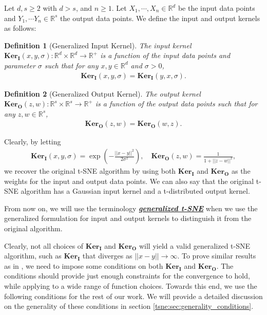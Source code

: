 \documentclass[10pt]{article}
\newtheorem{definition}{\bf Definition}
\newenvironment{Proof of lemma}{\noindent{\bf Proof of Lemma}}{\hfill$\Box$\newline}
\newenvironment{Proof of claim}{\noindent{\bf Proof of claim}}{\hfill$\Box$\newline}
\newenvironment{Proof of theorem}{\noindent{\bf Proof of Theorem}}{\hfill\scriptsize{$\Box$}\newline}
\newenvironment{Proof of theorems}{\noindent{\bf Proof of Theorems}}{\hfill$\Box$\newline}
\newenvironment{Proof of proposition}{\noindent{\bf Proof of Proposition}}{\hfill$\Box$\newline}
\newenvironment{Proof of propositions}{\noindent{\bf Proof of Propositions}}{\hfill$\Box$\newline}
\newenvironment{Proof of exercise}{\noindent{\it Proof of Exercise:}}{\hfill$\Box$}
\numberwithin{equation}{section}
\newcommand{\ki}{\mathbf{Ker}_{\mathbf{I}}}
\newcommand{\ko}{\mathbf{Ker}_{\mathbf{O}}}
\begin{document}
Let $d,s \geq 2$ with $d>s$, and $n \geq 1$. Let $X_1, \cdots, X_n \in
    \mathbb{R}^d$ be the input data points and $Y_1, \cdots Y_n \in \mathbb{R}^s$
the output data points. We define the input and output kernels as follows:
\begin{definition} [Generalized Input Kernel] \label{def:input_kernel}
    The input kernel $\ki(x,y,\sigma): \mathbb{R}^d  \times \mathbb{R}^d \to \mathbb{R}^+$ is a function of the input data points and parameter $\sigma$ such that for any $x,y \in \mathbb{R}^d$ and $\sigma > 0$,
    \begin{align}
        \ki(x,y,\sigma)=\ki(y,x,\sigma).
    \end{align}
\end{definition}
\begin{definition} [Generalized Output Kernel] \label{def:output_kernel}
    The output kernel $\ko(z,w):\mathbb{R}^s \times \mathbb{R}^s \to \mathbb{R}^+$ is a function of the output data points such that for any $z,w \in \mathbb{R}^s$,
    \begin{align}
        \ko(z,w)=\ko(w,z).
    \end{align}
\end{definition}
Clearly, by letting
\begin{align}
    \ki(x,y,\sigma)=\exp\left(-\frac{||x-y||^2}{2\sigma^2}\right), \quad \ko(z,w)=\frac{1}{1+||z-w||^2},
\end{align}
we recover the original t-SNE algorithm by using both $\ki$ and $\ko$ as the weights for the input and output data points. We can also say that the original t-SNE algorithm has a Gaussian input kernel and a t-distributed output kernel.

From now on, we will use the terminology \underline{\textbf{\textit{generalized
            t-SNE}}} when we use the generalized formulation for input and output kernels
to distinguish it from the original algorithm.

Clearly, not all choices of $\ki$ and $\ko$ will yield a valid generalized
t-SNE algorithm, such as $\ki$ that diverges as $||x-y|| \to \infty$. To prove
similar results as in \cite{auffinger-tsne}, we need to impose some conditions
on both $\ki$ and $\ko$. The conditions should provide just enough constraints
for the convergence to hold, while applying to a wide range of function
choices. Towards this end, we use the following conditions for the rest of our
work. We will provide a detailed discussion on the generality of these
conditions in section \ref{tsne:sec:generality_conditions}.
\end{document}
